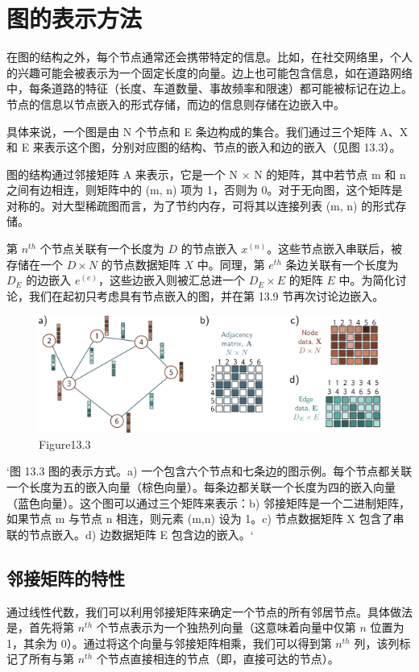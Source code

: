 \section{图的表示方法}
在图的结构之外，每个节点通常还会携带特定的信息。比如，在社交网络里，个人的兴趣可能会被表示为一个固定长度的向量。边上也可能包含信息，如在道路网络中，每条道路的特征（长度、车道数量、事故频率和限速）都可能被标记在边上。节点的信息以节点嵌入的形式存储，而边的信息则存储在边嵌入中。

具体来说，一个图是由 N 个节点和 E 条边构成的集合。我们通过三个矩阵 A、X 和 E 来表示这个图，分别对应图的结构、节点的嵌入和边的嵌入（见图 13.3）。

图的结构通过邻接矩阵 A 来表示，它是一个 N × N 的矩阵，其中若节点 m 和 n 之间有边相连，则矩阵中的 (m, n) 项为 1，否则为 0。对于无向图，这个矩阵是对称的。对大型稀疏图而言，为了节约内存，可将其以连接列表 (m, n) 的形式存储。

第 \(n^{th}\) 个节点关联有一个长度为 \(D\) 的节点嵌入 \(x^{(n)}\)。这些节点嵌入串联后，被存储在一个 \(D \times N\) 的节点数据矩阵 \(X\) 中。同理，第 \(e^{th}\) 条边关联有一个长度为 \(D_E\) 的边嵌入 \(e^{(e)}\)，这些边嵌入则被汇总进一个 \(D_E \times E\) 的矩阵 \(E\) 中。为简化讨论，我们在起初只考虑具有节点嵌入的图，并在第 13.9 节再次讨论边嵌入。

\begin{figure}[ht!]
\centering
\includegraphics[width=0.7\linewidth]{png/chapter13/GraphNodeEdgeAdjacency.png}
\caption{Figure13.3}
\end{figure}

`图 13.3 图的表示方式。a) 一个包含六个节点和七条边的图示例。每个节点都关联一个长度为五的嵌入向量（棕色向量）。每条边都关联一个长度为四的嵌入向量（蓝色向量）。这个图可以通过三个矩阵来表示：b) 邻接矩阵是一个二进制矩阵，如果节点 m 与节点 n 相连，则元素 (m,n) 设为 1。c) 节点数据矩阵 X 包含了串联的节点嵌入。d) 边数据矩阵 E 包含边的嵌入。`

\subsection{邻接矩阵的特性}
通过线性代数，我们可以利用邻接矩阵来确定一个节点的所有邻居节点。具体做法是，首先将第 \(n^{th}\) 个节点表示为一个独热列向量（这意味着向量中仅第 \(n\) 位置为 1，其余为 0）。通过将这个向量与邻接矩阵相乘，我们可以得到第 \(n^{th}\) 列，该列标记了所有与第 \(n^{th}\) 个节点直接相连的节点（即，直接可达的节点）。

